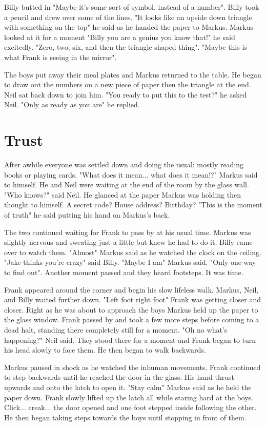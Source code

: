 \documentclass[12pt]{book}
\begin{document}
Billy butted in "Maybe it's some sort of symbol, instead of a number". Billy took a pencil and drew over some of the lines. "It looks like an upside down triangle with something on the top" he said as he handed the paper to Markus. Markus looked at it for a moment "Billy you are a genius you know that!" he said excitedly. "Zero, two, six, and then the triangle shaped thing". "Maybe this is what Frank is seeing in the mirror".

The boys put away their meal plates and Markus returned to the table. He began to draw out the numbers on a new piece of paper then the triangle at the end. Neil sat back down to join him. "You ready to put this to the test?" he asked Neil. "Only as ready as you are" he replied.

\chapter{Trust}

After awhile everyone was settled down and doing the usual: mostly reading books or playing cards. "What does it mean... what does it mean!?" Markus said to himself. He and Neil were waiting at the end of the room by the glass wall. "Who knows?" said Neil. He glanced at the paper Markus was holding then thought to himself. A secret code? House address? Birthday? "This is the moment of truth" he said putting his hand on Markus's back.

The two continued waiting for Frank to pass by at his usual time. Markus was slightly nervous and sweating just a little but knew he had to do it. Billy came over to watch them. "Almost" Markus said as he watched the clock on the ceiling. "Jake thinks you're crazy" said Billy. "Maybe I am" Markus said. "Only one way to find out". Another moment passed and they heard footsteps. It was time.

Frank appeared around the corner and begin his slow lifeless walk. Markus, Neil, and Billy waited further down. "Left foot right foot" Frank was getting closer and closer. Right as he was about to approach the boys Markus held up the paper to the glass window. Frank passed by and took a few more steps before coming to a dead halt, standing there completely still for a moment. "Oh no what's happening?" Neil said. They stood there for a moment and Frank began to turn his head slowly to face them. He then began to walk backwards.

Markus paused in shock as he watched the inhuman movements. Frank continued to step backwards until he reached the door in the glass. His hand thrust upwards and onto the latch to open it. "Stay calm" Markus said as he held the paper down. Frank slowly lifted up the latch all while staring hard at the boys. Click... creak... the door opened and one foot stepped inside following the other. He then began taking steps towards the boys until stopping in front of them.
\end{document}
